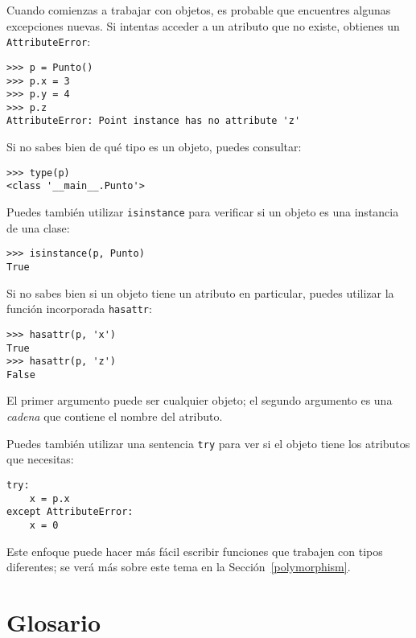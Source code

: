 \documentclass[10pt]{book}
\begin{document}
Cuando comienzas a trabajar con objetos, es probable que encuentres
algunas excepciones nuevas.  Si intentas acceder a un atributo
que no existe, obtienes un {\tt AttributeError}:

\begin{verbatim}
>>> p = Punto()
>>> p.x = 3
>>> p.y = 4
>>> p.z
AttributeError: Point instance has no attribute 'z'
\end{verbatim}
%
Si no sabes bien de qué tipo es un objeto, puedes consultar:

\begin{verbatim}
>>> type(p)
<class '__main__.Punto'>
\end{verbatim}
%
Puedes también utilizar {\tt isinstance} para verificar si un objeto
es una instancia de una clase:

\begin{verbatim}
>>> isinstance(p, Punto)
True
\end{verbatim}
%
Si no sabes bien si un objeto tiene un atributo en particular,
puedes utilizar la función incorporada {\tt hasattr}:

\begin{verbatim}
>>> hasattr(p, 'x')
True
>>> hasattr(p, 'z')
False
\end{verbatim}
%
El primer argumento puede ser cualquier objeto; el segundo argumento es una {\em
cadena} que contiene el nombre del atributo.

Puedes también utilizar una sentencia {\tt try} para ver si el objeto tiene los
atributos que necesitas:

\begin{verbatim}
try:
    x = p.x
except AttributeError:
    x = 0
\end{verbatim}

Este enfoque puede hacer más fácil escribir funciones que trabajen con
tipos diferentes; se verá más sobre este tema
en la Sección~\ref{polymorphism}.


\section{Glosario}
\end{document}

